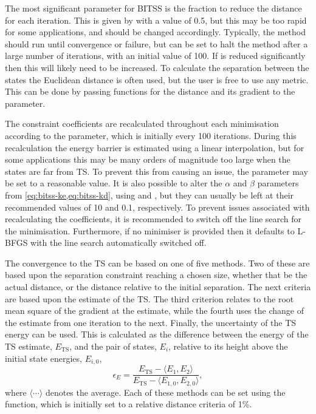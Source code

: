 The most significant parameter for BITSS is the fraction to reduce the distance for each iteration.
This is given by  with a value of 0.5, but this may be too rapid for some applications, and should be changed accordingly.
Typically, the method should run until convergence or failure, but  can be set to halt the method after a large number of iterations, with an initial value of 100.
If  is reduced significantly then this will likely need to be increased.
To calculate the separation between the states the Euclidean distance is often used, but the user is free to use any metric.
This can be done by passing functions for the distance and its gradient to the  parameter.

The constraint coefficients are recalculated throughout each minimisation according to the  parameter, which is initially every 100 iterations.
During this recalculation the energy barrier is estimated using a linear interpolation, but for some applications this may be many orders of magnitude too large when the states are far from TS.
To prevent this from causing an issue, the  parameter may be set to a reasonable value.
It is also possible to alter the $\alpha$ and $\beta$ parameters from \cref{eq:bitss-ke,eq:bitss-kd}, using  and , but they can usually be left at their recommended values of 10 and 0.1, respectively.
To prevent issues associated with recalculating the coefficients, it is recommended to switch off the line search for the minimisation.
Furthermore, if no minimiser is provided then it defaults to L-BFGS with the line search automatically switched off.

The convergence to the TS can be based on one of five methods.
Two of these are based upon the separation constraint reaching a chosen size, whether that be the actual distance, or the distance relative to the initial separation.
The next criteria are based upon the estimate of the TS.
The third criterion relates to the root mean square of the gradient at the estimate, while the fourth uses the change of the estimate from one iteration to the next.
Finally, the uncertainty of the TS energy can be used.
This is calculated as the difference between the energy of the TS estimate, $E_\text{TS}$, and the pair of states, $E_i$, relative to its height above the initial state energies, $E_{i,0}$,
\begin{equation}
  \epsilon_E = \frac {E_\text{TS} - \langle E_1, E_2 \rangle} {E_\text{TS} - \langle E_{1,0}, E_{2,0} \rangle},
\end{equation}
where $\langle\cdots\rangle$ denotes the average.
Each of these methods can be set using the  function, which is initially set to a relative distance criteria of 1\%.

